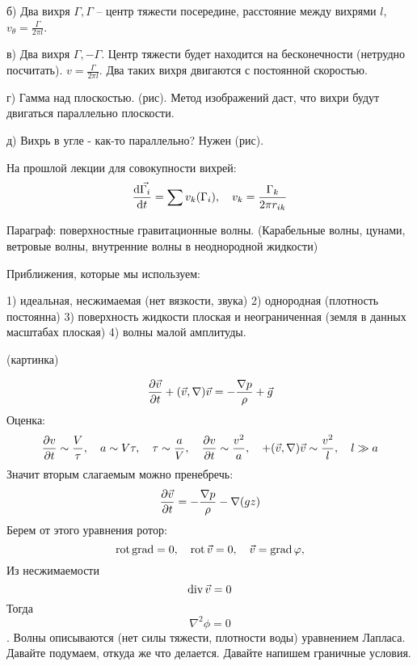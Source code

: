 б) Два вихря $\Gamma, \Gamma$ -- центр тяжести посередине, расстояние между вихрями $l$, $v_\theta=\frac{\Gamma}{2\pi l}$.

в) Два вихря $\Gamma, -\Gamma$. Центр тяжести будет находится на бесконечности (нетрудно посчитать). $v=\frac{\Gamma}{2\pi l}$. Два таких вихря двигаются с постоянной скоростью.

г) Гамма над плоскостью. (рис). Метод изображений даст, что вихри будут двигаться параллельно плоскости.

д) Вихрь в угле - как-то параллельно? Нужен (рис).



На прошлой лекции для совокупности вихрей:
\begin{gather}
	\label{eqga}
	\dv{\vec{\Gamma_i}}{t}=\sum v_k(\Gamma_i), \quad v_k=\frac{\Gamma_k}{2\pi r_{ik}}
\end{gather}


Параграф: поверхностные гравитационные волны. (Карабельные волны, цунами, ветровые волны, внутренние волны в неоднородной жидкости)

Приближения, которые мы используем:

1) идеальная, несжимаемая (нет вязкости, звука)
2) однородная (плотность постоянна)
3) поверхность жидкости плоская и неограниченная (земля в данных масштабах плоская)
4) волны малой амплитуды.

(картинка)
\begin{comment}

       |<------ l ----->|
   ________        ___________
  /        \       /          ^
/           \ _ _ /           | a
------------------------------------------
\end{comment}
\begin{gather}
	\label{eq}
	\pdv{\vec{v}}{t}+(\vec{v},\nabla)\vec{v}=-\frac{\nabla p}{\rho}+\vec{g}
\end{gather}
Оценка:
\begin{gather}
	\label{eq}
	\pdv{v}{t}\sim\frac{V}{\tau}, \quad a\sim V\tau, \quad \tau \sim \frac{a}{V},
	\quad \pdv{v}{t}\sim \frac{v^2}{a}, \quad +(\vec{v},\nabla)\vec{v}\sim \frac{v^2}{l},
	\quad l\gg a
\end{gather}
Значит вторым слагаемым можно пренебречь:
\begin{gather}
	\label{eq}
	\pdv{\vec{v}}{t}=-\frac{\nabla p}{\rho}-\nabla(gz)
\end{gather}
Берем от этого уравнения ротор:
\begin{equation}
	\operatorname{rot}\operatorname{grad}=0, \quad
	\operatorname{rot}\vec{v}=0, \quad \vec{v}=\operatorname{grad}\varphi,
\end{equation}
Из несжимаемости
\begin{equation}
	\operatorname{div}\vec{v}=0
\end{equation}
Тогда
\begin{equation}
	\nabla^2\phi=0
\end{equation}.
Волны описываются (нет силы тяжести, плотности воды) уравнением Лапласа. 
Давайте подумаем, откуда же что делается. 
Давайте напишем граничные условия.

